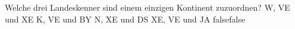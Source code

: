     {Welche drei Landeskenner sind einem einzigen Kontinent zuzuordnen?}
    {W, VE und XE}
    {K, VE und BY}
    {N, XE und DS}
    {XE, VE und JA}
    {false}{false}